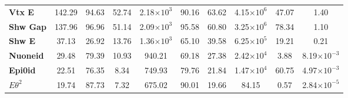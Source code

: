 \begin{table}[!hb]
\begin{tabular}{|l|ccc|ccc|ccc|}
\textbf{Vtx E}         & 142.29            & 94.63                                                              & 52.74                                     & 2.18$\times 10^3$           & 90.16                                                               & 63.62                                      & 4.15$\times 10^6$          & 47.07                                                              & 1.40                                      \\
\textbf{Shw Gap}          & 137.96            & 96.96                                                              & 51.14                                     & 2.09$\times 10^3$           & 95.58                                                               & 60.80                                      & 3.25$\times 10^6$          & 78.34                                                              & 1.10                                      \\
\textbf{Shw E}      & 37.13             & 26.92                                                              & 13.76                                     & 1.36$\times 10^3$           & 65.10                                                               & 39.58                                      & 6.25$\times 10^5$          & 19.21                                                              & 0.21                                      \\
\textbf{Nuoneid}      & 29.48             & 79.39                                                              & 10.93                                     & 940.21             & 69.18                                                               & 27.38                                      & 2.42$\times 10^4$ & 3.88                                                               & 8.19$\times 10^{-3}$                                  \\
\textbf{Epi0id}       & 22.51             & 76.35                                                              & 8.34                                      & 749.93             & 79.76                                                               & 21.84                                      & 1.47$\times 10^4$ & 60.75                                                              & 4.97$\times 10^{-3}$                                  \\
\rowcolor[HTML]{67FD9A}
\textbf{$E\theta^2$}      & 19.74             & 87.73                                                              & 7.32                                      & 675.02             & 90.01                                                               & 19.66                                      & 84.15             & 0.57                                                               & 2.84$\times 10^{-5}$                                 \\\hline\hline

\end{tabular}
\end{table}
